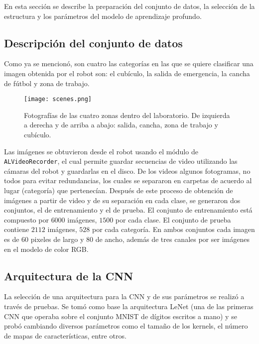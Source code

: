 %
%
%
En esta sección se describe la preparación del conjunto de datos, 
la selección de la estructura y los parámetros del modelo de aprendizaje profundo.

\subsection{Descripción del conjunto de datos\label{sec:dataset-def}}

Como ya se mencionó, son cuatro las categorías en las que se quiere
clasificar una imagen obtenida por el robot son: el cubículo,
la salida de emergencia, la cancha de fútbol y zona de trabajo.

\begin{figure}[ht]
    \centering
    \texttt{[image: scenes.png]}
    \caption{Fotografías de las cuatro zonas dentro del laboratorio. De izquierda a derecha y
    de arriba a abajo: salida, cancha, zona de trabajo y cubículo.
    }
    \label{fig:scenes}
\end{figure}

Las imágenes se obtuvieron desde el robot usando el módulo de\\
\texttt{ALVideoRecorder},
el cual permite guardar secuencias de video utilizando las cámaras del robot y guardarlas 
en el disco. De los videos algunos fotogramas, no todos para evitar
redundancias, los cuales se separaron en carpetas
de acuerdo al lugar (categoría) que pertenecían. Después de este proceso
de obtención de imágenes a partir de video y de su separación en cada clase, se
generaron dos conjuntos, el de entrenamiento y el de prueba. El conjunto 
de entrenamiento está compuesto por $6000$ imágenes, $1500$ por cada clase.
El conjunto de prueba contiene $2112$ imágenes, $528$ por cada categoría.
En ambos conjuntos cada imagen es de 60 pixeles de largo y 80 de ancho,
además de tres canales por ser imágenes en el modelo de color RGB.


\subsection{Arquitectura de la CNN}

La selección de una arquitectura para la CNN y de sus parámetros se
realizó a través de pruebas. Se tomó como base 
la arquitectura LeNet (una de las primeras CNN que operaba sobre el 
conjunto MNIST de dígitos escritos a mano) y se probó cambiando
diversos parámetros como el tamaño de los kernels, el número de
mapas de características, entre otros.

